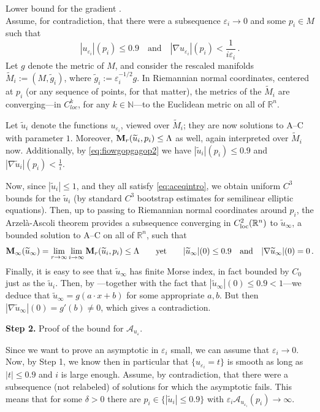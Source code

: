 \documentclass{article}
\newcommand{\N}{\mathbb{N}}
\newcommand{\R}{\mathbb{R}}
\newcommand{\ep}{\varepsilon}
\theoremstyle{definition}
\begin{document}
 Lower bound for the gradient .\\
Assume, for contradiction, that there were a subsequence $\ep_i\to 0$ and some $p_i\in M$ such that 
    \begin{equation}\label{eq:fiowgopgagop2}
         |u_{\ep_i}|(p_i)\leq 0.9 \quad\mbox{and}\quad|\nabla u_{\ep_i}|(p_i)<\frac{1}{i\ep_i}\,.
    \end{equation}
    Let $g$ denote the metric of $M$, and consider the rescaled manifolds $\widetilde M_i:=(M,\widetilde g_i)$, where $\widetilde g_i:=\ep_i^{-1/2}g$. In Riemannian normal coordinates, centered at $p_i$ (or any sequence of points, for that matter), the metrics of the $\widetilde M_i$ are converging---in $C^k_{loc}$, for any $k\in\N$---to the Euclidean metric on all of $\R^n$.
    
    Let $\widetilde u_i$ denote the functions $u_{\ep_i}$, viewed over $\widetilde M_i$; they are now solutions to A--C with parameter $1$. Moreover, ${\bf M}_r(\widetilde u_i,p_i)\leq \Lambda$ as well, again interpreted over $\widetilde M_i$ now. Additionally, by \eqref{eq:fiowgopgagop2} we have $|\widetilde u_i|(p_i)\leq 0.9$ and $|\nabla \widetilde u_i|(p_i)<\frac{1}{i}$.
    
    Now, since $|\widetilde u_i|\leq 1$, and they all satisfy \eqref{eq:aceqintro}, we obtain uniform $C^3$ bounds for the $\widetilde u_i$ (by standard $C^3$ bootstrap estimates for semilinear elliptic equations). Then, up to passing to Riemannian normal coordinates around $p_i$, the Arzel\`a-Ascoli theorem provides a subsequence converging in $C^2_{\rm loc}(\R^n)$ to $\widetilde u_\infty$, a bounded solution to A--C on all of $\R^n$, such that
    $${\bf M}_\infty(\widetilde u_\infty)=\lim_{r\to\infty}\lim_{i\to\infty} {\bf M}_r(\widetilde u_i, p_i)\leq \Lambda\qquad\mbox{yet}\qquad |\widetilde u_\infty|(0)\leq 0.9\quad\mbox{and}\quad|\nabla \widetilde u_\infty|(0)=0\,.$$
    Finally, it is easy to see that $\widetilde u_\infty$ has finite Morse index, in fact bounded by $C_0$ just as the $\widetilde u_i$. Then, by ---together with the fact that $|\widetilde u_\infty|(0)\leq 0.9<1$---we deduce that $\widetilde u_\infty=g(a\cdot x+b)$ for some appropriate $a,b$. But then $|\nabla \widetilde u_\infty|(0)=g'(b)\neq 0$, which gives a contradiction.
    
    \noindent \textbf{Step 2.} Proof of the bound for $\mathcal A_{u_{\ep}}$.

    Since we want to prove an asymptotic in $\ep_i$ small, we can assume that $\ep_i\to 0$. Now, by Step 1, we know then in particular that $\{u_{\ep_i}=t\}$ is smooth as long as $|t|\leq 0.9$ and $i$ is large enough.
    Assume, by contradiction, that there were a subsequence (not relabeled) of solutions for which the asymptotic fails. This means that for some $\delta>0$ there are $p_i\in \{|\widetilde u_i|\leq 0.9\}$ with $\ep_i\mathcal A_{u_{\ep_i}}(p_i)\to\infty$.
    
\end{document}
